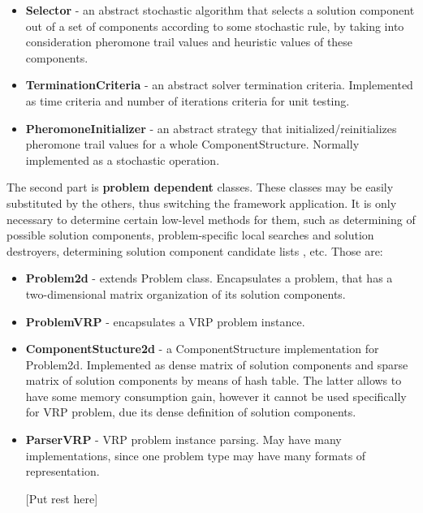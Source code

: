 \documentclass[11pt,a4paper,oneside]{book}
\begin{document}
\begin{itemize}
\item \textbf{Selector} - an abstract stochastic algorithm that selects a solution component out of a set of components according to some stochastic rule, by taking into consideration pheromone trail values and heuristic values of these components.

\item \textbf{TerminationCriteria} - an abstract solver termination criteria. Implemented as time criteria and number of iterations criteria for unit testing.

\item \textbf{PheromoneInitializer} - an abstract strategy that initialized/reinitializes pheromone trail values for a whole ComponentStructure. Normally implemented as a stochastic operation.

\end{itemize}

The second part is \textbf{problem dependent} classes. These classes may be easily substituted by the others, thus switching the framework application. It is only necessary to determine certain low-level methods for them, such as determining of possible solution components, problem-specific local searches and solution destroyers, determining solution component candidate lists , etc. Those are:

\begin{itemize}
\item \textbf{Problem2d} - extends Problem class. Encapsulates a problem, that has a two-dimensional matrix organization of its solution components.

\item \textbf{ProblemVRP} - encapsulates a VRP problem instance.

\item \textbf{ComponentStucture2d} - a ComponentStructure implementation for Problem2d. Implemented as dense matrix of solution components and sparse matrix of solution components by means of hash table. The latter allows to have some memory consumption gain, however it cannot be used specifically for VRP problem, due its dense definition of solution components.

\item \textbf{ParserVRP} - VRP problem instance parsing. May have many implementations, since one problem type may have many formats of representation.

[Put rest here]

\end{itemize}
\end{document}
